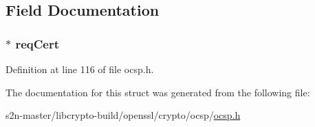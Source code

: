 \subsection{Field Documentation}
\subsubsection[{\texorpdfstring{req\+Cert}{reqCert}}]{ $\ast$ req\+Cert}\hypertarget{structocsp__one__request__st_a5328ad78dbaca6bf8aa731b3d10983fd}{}\label{structocsp__one__request__st_a5328ad78dbaca6bf8aa731b3d10983fd}


Definition at line 116 of file ocsp.\+h.



The documentation for this struct was generated from the following file\+:\begin{DoxyCompactItemize}
\item 
s2n-\/master/libcrypto-\/build/openssl/crypto/ocsp/\hyperlink{crypto_2ocsp_2ocsp_8h}{ocsp.\+h}\end{DoxyCompactItemize}

